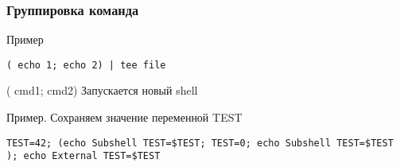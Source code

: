 \begin{frame}[fragile]
	\frametitle{Группировка команда}
	
	\begin{block}{Пример}
		\begin{lstlisting}
( echo 1; echo 2) | tee file
		\end{lstlisting}
	\end{block}

	\pause
	\begin{block}{( cmd1; cmd2)}
	    Запускается новый shell
	\end{block}

	\begin{block}{Пример. Сохраняем значение переменной TEST}
		\begin{lstlisting}
TEST=42; (echo Subshell TEST=$TEST; TEST=0; echo Subshell TEST=$TEST ); echo External TEST=$TEST
		\end{lstlisting}
	\end{block}

\end{frame}
